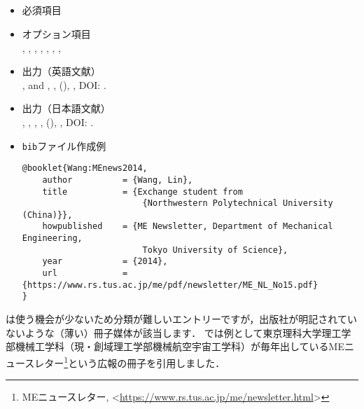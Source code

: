 \documentclass[a4paper,fleqn,uplatex,dvipdfmx]{jsarticle}
\begin{document}
\subsection{\ttbooklet}
\label{ssec:booklet}
\begin{tcolorbox}[enhanced, title=\ttbooklet, drop fuzzy shadow]
    \begin{itemize}
        \item 必須項目 \\
        \tttitle
        \item オプション項目 \\
        \ttauthor, \tthowpublished, \ttaddress, \ttmonth, \ttyear, \ttnote, \ttkey, \ttdoi
        \item 出力（英語文献） \\
            \colorbox[gray]{0.8}{\ttauthorf}, \colorbox[gray]{0.8}{\ttauthors} and \colorbox[gray]{0.8}{\ttauthort}, \colorbox[gray]{0.8}{\tttitle}, \colorbox[gray]{0.8}{\tthowpublished} (\colorbox[gray]{0.8}{\ttyear}), \colorbox[gray]{0.8}{\ttnote}, DOI: \colorbox[gray]{0.8}{\ttdoi}.
        \item 出力（日本語文献） \\
            \colorbox[gray]{0.8}{\ttauthorf}, \colorbox[gray]{0.8}{\ttauthors}, \colorbox[gray]{0.8}{\ttauthort}, \colorbox[gray]{0.8}{\tttitle}, \colorbox[gray]{0.8}{\tthowpublished} (\colorbox[gray]{0.8}{\ttyear}), \colorbox[gray]{0.8}{\ttnote}, DOI: \colorbox[gray]{0.8}{\ttdoi}.
        \item \verb|bib|ファイル作成例 \vspace{-3mm}
\begin{verbatim}
@booklet{Wang:MEnews2014,
    author          = {Wang, Lin},
    title           = {Exchange student from 
                        {Northwestern Polytechnical University (China)}},
    howpublished    = {ME Newsletter, Department of Mechanical Engineering, 
                        Tokyo University of Science},
    year            = {2014},
    url             = {https://www.rs.tus.ac.jp/me/pdf/newsletter/ME_NL_No15.pdf}
}
\end{verbatim}
    \end{itemize}
\end{tcolorbox}

\ttbooklet は使う機会が少ないため分類が難しいエントリーですが，出版社が明記されていないような（薄い）冊子媒体が該当します．
\JSMErepos では例として東京理科大学理工学部機械工学科（現・創域理工学部機械航空宇宙工学科）が毎年出しているMEニュースレター\footnote{MEニュースレター, \textless\url{https://www.rs.tus.ac.jp/me/newsletter.html}\textgreater}という広報の冊子を引用しました．
\end{document}

